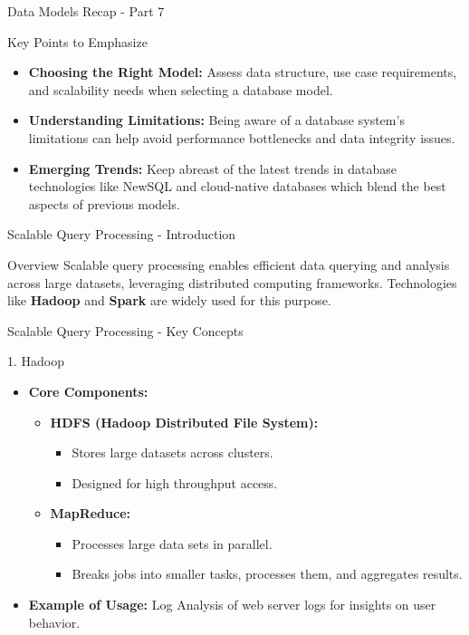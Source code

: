 \documentclass[aspectratio=169]{beamer}
\begin{document}
\begin{frame}[fragile]{Data Models Recap - Part 7}
  \begin{block}{Key Points to Emphasize}
    \begin{itemize}
      \item \textbf{Choosing the Right Model:} Assess data structure, use case requirements, and scalability needs when selecting a database model.
      \item \textbf{Understanding Limitations:} Being aware of a database system's limitations can help avoid performance bottlenecks and data integrity issues.
      \item \textbf{Emerging Trends:} Keep abreast of the latest trends in database technologies like NewSQL and cloud-native databases which blend the best aspects of previous models.
    \end{itemize}
  \end{block}
\end{frame}

\begin{frame}[fragile]{Scalable Query Processing - Introduction}
  \begin{block}{Overview}
    Scalable query processing enables efficient data querying and analysis across large datasets, leveraging distributed computing frameworks. 
    Technologies like \textbf{Hadoop} and \textbf{Spark} are widely used for this purpose.
  \end{block}
\end{frame}

\begin{frame}[fragile]{Scalable Query Processing - Key Concepts}
  \begin{block}{1. Hadoop}
    \begin{itemize}
      \item \textbf{Core Components:}
        \begin{itemize}
          \item \textbf{HDFS (Hadoop Distributed File System):} 
            \begin{itemize}
              \item Stores large datasets across clusters.
              \item Designed for high throughput access.
            \end{itemize}
          \item \textbf{MapReduce:} 
            \begin{itemize}
              \item Processes large data sets in parallel.
              \item Breaks jobs into smaller tasks, processes them, and aggregates results.
            \end{itemize}
        \end{itemize}
      \item \textbf{Example of Usage:} Log Analysis of web server logs for insights on user behavior.
    \end{itemize}
  \end{block}
\end{frame}
\end{document}
